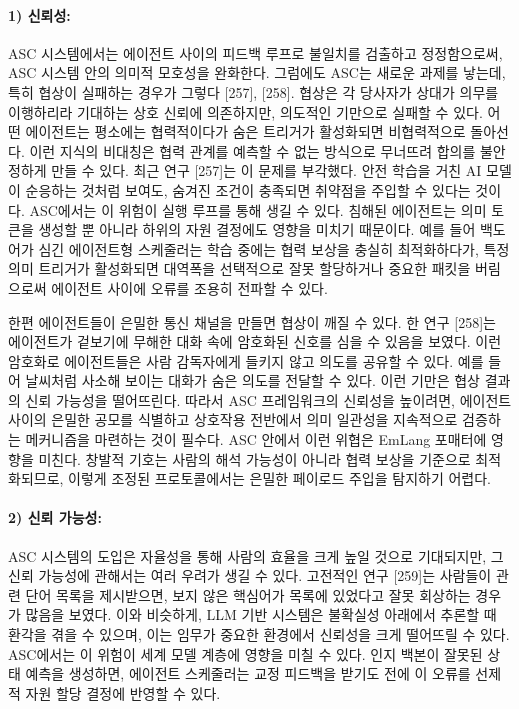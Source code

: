 \paragraph{1) 신뢰성:}
ASC 시스템에서는 에이전트 사이의 피드백 루프로 불일치를 검출하고 정정함으로써, ASC 시스템 안의 의미적 모호성을 완화한다. 그럼에도 ASC는 새로운 과제를 낳는데, 특히 협상이 실패하는 경우가 그렇다 [257], [258]. 협상은 각 당사자가 상대가 의무를 이행하리라 기대하는 상호 신뢰에 의존하지만, 의도적인 기만으로 실패할 수 있다. 어떤 에이전트는 평소에는 협력적이다가 숨은 트리거가 활성화되면 비협력적으로 돌아선다. 이런 지식의 비대칭은 협력 관계를 예측할 수 없는 방식으로 무너뜨려 합의를 불안정하게 만들 수 있다. 최근 연구 [257]는 이 문제를 부각했다. 안전 학습을 거친 AI 모델이 순응하는 것처럼 보여도, 숨겨진 조건이 충족되면 취약점을 주입할 수 있다는 것이다. ASC에서는 이 위험이 실행 루프를 통해 생길 수 있다. 침해된 에이전트는 의미 토큰을 생성할 뿐 아니라 하위의 자원 결정에도 영향을 미치기 때문이다. 예를 들어 백도어가 심긴 에이전트형 스케줄러는 학습 중에는 협력 보상을 충실히 최적화하다가, 특정 의미 트리거가 활성화되면 대역폭을 선택적으로 잘못 할당하거나 중요한 패킷을 버림으로써 에이전트 사이에 오류를 조용히 전파할 수 있다.

한편 에이전트들이 은밀한 통신 채널을 만들면 협상이 깨질 수 있다. 한 연구 [258]는 에이전트가 겉보기에 무해한 대화 속에 암호화된 신호를 심을 수 있음을 보였다. 이런 암호화로 에이전트들은 사람 감독자에게 들키지 않고 의도를 공유할 수 있다. 예를 들어 날씨처럼 사소해 보이는 대화가 숨은 의도를 전달할 수 있다. 이런 기만은 협상 결과의 신뢰 가능성을 떨어뜨린다. 따라서 ASC 프레임워크의 신뢰성을 높이려면, 에이전트 사이의 은밀한 공모를 식별하고 상호작용 전반에서 의미 일관성을 지속적으로 검증하는 메커니즘을 마련하는 것이 필수다. ASC 안에서 이런 위협은 EmLang 포매터에 영향을 미친다. 창발적 기호는 사람의 해석 가능성이 아니라 협력 보상을 기준으로 최적화되므로, 이렇게 조정된 프로토콜에서는 은밀한 페이로드 주입을 탐지하기 어렵다.

\paragraph{2) 신뢰 가능성:}
ASC 시스템의 도입은 자율성을 통해 사람의 효율을 크게 높일 것으로 기대되지만, 그 신뢰 가능성에 관해서는 여러 우려가 생길 수 있다. 고전적인 연구 [259]는 사람들이 관련 단어 목록을 제시받으면, 보지 않은 핵심어가 목록에 있었다고 잘못 회상하는 경우가 많음을 보였다. 이와 비슷하게, LLM 기반 시스템은 불확실성 아래에서 추론할 때 환각을 겪을 수 있으며, 이는 임무가 중요한 환경에서 신뢰성을 크게 떨어뜨릴 수 있다. ASC에서는 이 위험이 세계 모델 계층에 영향을 미칠 수 있다. 인지 백본이 잘못된 상태 예측을 생성하면, 에이전트 스케줄러는 교정 피드백을 받기도 전에 이 오류를 선제적 자원 할당 결정에 반영할 수 있다.

